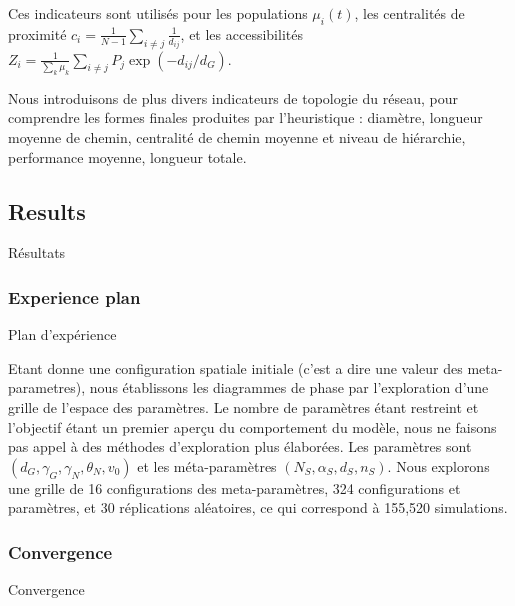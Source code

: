 Ces indicateurs sont utilisés pour les populations $\mu_i(t)$, les centralités de proximité $c_i = \frac{1}{N-1}\sum_{i\neq j} \frac{1}{d_{ij}}$, et les accessibilités $Z_i = \frac{1}{\sum_k \mu_k}\sum_{i\neq j} P_j \exp{\left(- d_{ij}/d_G\right)}$.



Nous introduisons de plus divers indicateurs de topologie du réseau, pour comprendre les formes finales produites par l'heuristique : diamètre, longueur moyenne de chemin, centralité de chemin moyenne et niveau de hiérarchie, performance moyenne, longueur totale.




\subsection{Results}{Résultats}


\subsubsection{Experience plan}{Plan d'expérience}

Etant donne une configuration spatiale initiale (c'est a dire une valeur des meta-parametres), nous établissons les diagrammes de phase par l'exploration d'une grille de l'espace des paramètres. Le nombre de paramètres étant restreint et l'objectif étant un premier aperçu du comportement du modèle, nous ne faisons pas appel à des méthodes d'exploration plus élaborées. Les paramètres sont $(d_G,\gamma_G,\gamma_N,\theta_N,v_0)$ et les méta-paramètres $(N_S,\alpha_S,d_S,n_S)$. Nous explorons une grille de 16 configurations des meta-paramètres, 324 configurations et paramètres, et 30 réplications aléatoires, ce qui correspond à 155,520 simulations.



\subsubsection{Convergence}{Convergence}


